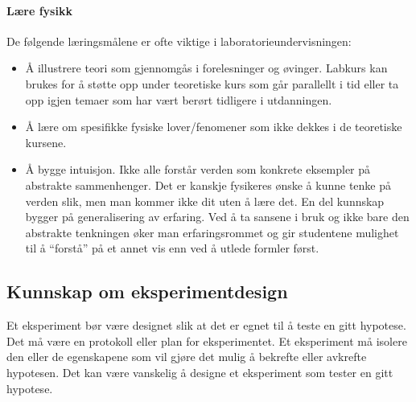 \documentclass{article}
\begin{document}
\paragraph{Lære fysikk}
De følgende læringsmålene er ofte viktige i laboratorieundervisningen:
\begin{itemize}
  \item Å illustrere teori som gjennomgås i forelesninger og øvinger. Labkurs kan brukes for å støtte opp under teoretiske kurs som går parallellt i tid eller ta opp igjen temaer som har vært berørt tidligere i utdanningen.
  \item Å lære om spesifikke fysiske lover/fenomener som
    ikke dekkes i de teoretiske kursene.
  \item Å bygge intuisjon. Ikke alle forstår verden som konkrete eksempler på abstrakte sammenhenger. Det er kanskje fysikeres ønske å kunne tenke på verden slik, men man kommer ikke dit uten å lære det. En del kunnskap bygger på generalisering av erfaring. Ved å ta sansene i bruk og ikke bare den abstrakte tenkningen øker man erfaringsrommet og gir studentene mulighet til å “forstå” på et annet vis enn ved å utlede formler først.
\end{itemize}

\subsection{Kunnskap om eksperimentdesign}
Et eksperiment bør være designet slik at det er egnet til å teste en gitt hypotese.
Det må være en protokoll eller plan for eksperimentet.
Et eksperiment må isolere den eller de egenskapene som vil gjøre det mulig å bekrefte eller avkrefte hypotesen.
Det kan være vanskelig å designe et eksperiment som tester en gitt hypotese.
\end{document}
